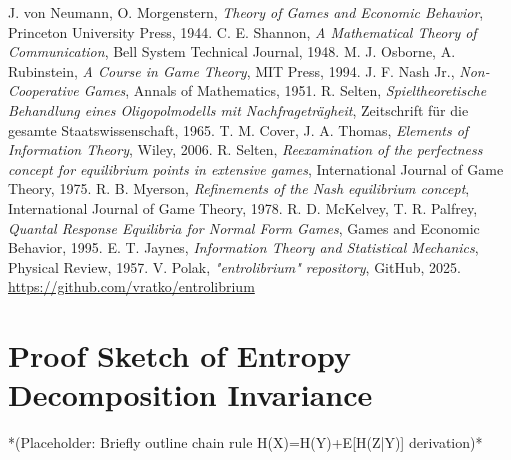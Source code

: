 \documentclass{article}
\begin{document}
\begin{thebibliography}{9}
 J. von Neumann, O. Morgenstern, \emph{Theory of Games and Economic Behavior}, Princeton University Press, 1944.
 C. E. Shannon, \emph{A Mathematical Theory of Communication}, Bell System Technical Journal, 1948.
 M. J. Osborne, A. Rubinstein, \emph{A Course in Game Theory}, MIT Press, 1994.
 J. F. Nash Jr., \emph{Non-Cooperative Games}, Annals of Mathematics, 1951.
 R. Selten, \emph{Spieltheoretische Behandlung eines Oligopolmodells mit Nachfrageträgheit}, Zeitschrift für die gesamte Staatswissenschaft, 1965.
 T. M. Cover, J. A. Thomas, \emph{Elements of Information Theory}, Wiley, 2006. %
 R. Selten, \emph{Reexamination of the perfectness concept for equilibrium points in extensive games}, International Journal of Game Theory, 1975.
 R. B. Myerson, \emph{Refinements of the Nash equilibrium concept}, International Journal of Game Theory, 1978.
 R. D. McKelvey, T. R. Palfrey, \emph{Quantal Response Equilibria for Normal Form Games}, Games and Economic Behavior, 1995.
 E. T. Jaynes, \emph{Information Theory and Statistical Mechanics}, Physical Review, 1957.
 V. Polak, \emph{"entrolibrium" repository}, GitHub, 2025. \url{https://github.com/vratko/entrolibrium} %
\end{thebibliography}

\appendix
\section{Proof Sketch of Entropy Decomposition Invariance}
*(Placeholder: Briefly outline chain rule H(X)=H(Y)+E[H(Z|Y)] derivation)*
\end{document}

